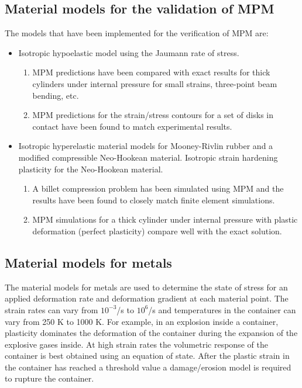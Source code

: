 \subsection{Material models for the validation of MPM}
The models that have been implemented for the verification of MPM
are:
\begin{itemize}
   \item Isotropic hypoelastic model using the Jaumann rate of 
         stress.
     \begin{enumerate}
        \item  MPM predictions have been compared with exact results 
               for thick cylinders under internal pressure for small
               strains, three-point beam bending, etc.
        \item  MPM predictions for the strain/stress contours for
               a set of disks in contact have been found to match
               experimental results.
     \end{enumerate}
   \item Isotropic hyperelastic material models for Mooney-Rivlin
         rubber and a modified compressible Neo-Hookean material. 
         Isotropic strain hardening plasticity for the Neo-Hookean
         material.
     \begin{enumerate}
        \item  A billet compression problem has been simulated using
               MPM and the results have been found to closely 
               match finite element simulations.
        \item  MPM simulations for a thick cylinder under internal
               pressure with plastic deformation (perfect plasticity)
               compare well with the exact solution.
     \end{enumerate}
\end{itemize}

\subsection{Material models for metals}
The material models for metals are used to determine
the state of stress  for an applied deformation
rate and deformation gradient at each material point.  The strain 
rates can vary from $10^{-3}$/s to $10^6$/s and temperatures in 
the container can vary from 250 K to 1000 K.  For example, in
an explosion inside a container, plasticity dominates
the deformation of the container during the expansion of the 
explosive gases inside.  At high strain rates the volumetric
response of the container is best obtained using an equation of 
state.  After the plastic strain in the container
has reached a threshold value a damage/erosion model is required to
rupture the container.

